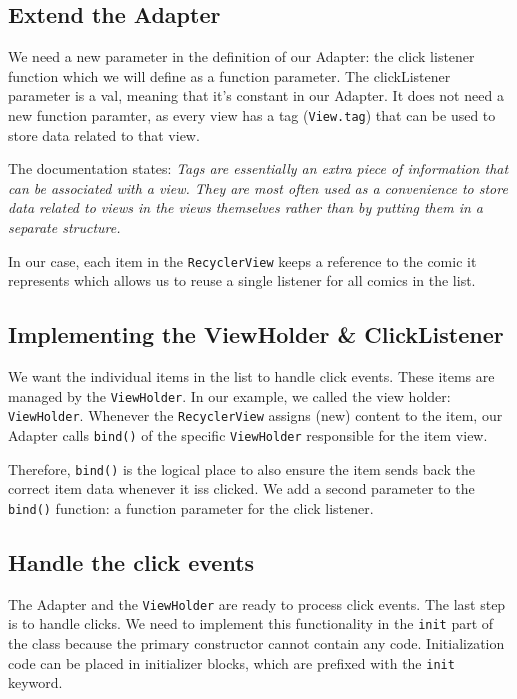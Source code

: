 \subsection*{Extend the Adapter}
We  need a new  parameter in the definition of our Adapter: the click listener function which we will define as a  function parameter. The clickListener parameter is a val, meaning that it’s constant in our Adapter. It does not need a new function paramter, as every view has a tag (\lstinline|View.tag|) that can be used to store data related to that view. 

The documentation states: \textit{Tags are essentially an extra piece of information that can be associated with a view. They are most often used as a convenience to store data related to views in the views themselves rather than by putting them in a separate structure.}

In our case, each item in the \lstinline|RecyclerView| keeps a reference to the comic it represents which  allows us to reuse a single listener for all comics in the list.

	

\subsection*{Implementing the ViewHolder \& ClickListener}
We want the individual items in the list to handle click events. These items are managed by the \lstinline|ViewHolder|. In our example, we called the view holder: \lstinline|ViewHolder|. Whenever the \lstinline|RecyclerView| assigns (new) content to the item, our Adapter calls \lstinline|bind()| of the specific \lstinline|ViewHolder| responsible for the item view.

Therefore, \lstinline|bind()| is the logical place to also ensure the item sends back the correct item data whenever it iss clicked. We add a second parameter to the  \lstinline|bind()| function: a function parameter for the click listener.



\subsection*{Handle the click events}
The Adapter and the \lstinline|ViewHolder| are ready to process click events. The last step is to handle clicks. We need to implement this functionality in the  \lstinline|init| part of the class because the primary constructor cannot contain any code. Initialization code can be placed in initializer blocks, which are prefixed with the \lstinline|init| keyword.

